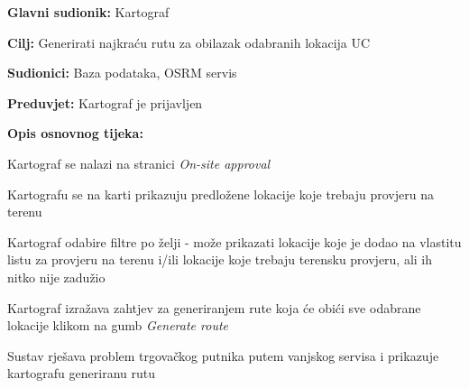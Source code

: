 					\noindent {}
					\begin{packed_item}
	
						\item \textbf{Glavni sudionik: }Kartograf
						\item  \textbf{Cilj:} Generirati najkraću rutu za obilazak odabranih lokacija
UC						\item  \textbf{Sudionici:} Baza podataka, OSRM servis
						\item  \textbf{Preduvjet:} Kartograf je prijavljen
						\item  \textbf{Opis osnovnog tijeka:}
						
						\item[] \begin{packed_enum}
	
							\item Kartograf se nalazi na stranici \textit{On-site approval}
							\item Kartografu se na karti prikazuju predložene lokacije koje trebaju provjeru na terenu
							\item Kartograf odabire filtre po želji - može prikazati lokacije koje je dodao na vlastitu listu za provjeru na terenu i/ili lokacije koje trebaju terensku provjeru, ali ih nitko nije zadužio
							\item Kartograf izražava zahtjev za generiranjem rute koja će obići sve odabrane lokacije klikom na gumb \textit{Generate route}
							\item Sustav rješava problem trgovačkog putnika putem vanjskog servisa i prikazuje kartografu generiranu rutu
							
						\end{packed_enum}
						
					\end{packed_item}
					

